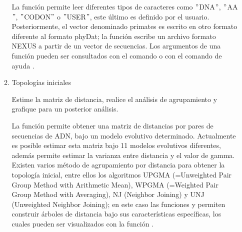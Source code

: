 \begin{itemize}
\begin{enumerate}
La funci\'on  permite leer diferentes tipos de caracteres como $"$DNA$"$,  $"$AA$"$,  $"$CODON$"$ o $"$USER$"$,  este \'ultimo es definido por el usuario. Posteriormente, el vector denominado primates es escrito en otro formato diferente al formato phyDat; la funci\'on  escribe un archivo formato NEXUS a partir de un vector de secuencias. Los argumentos de una funci\'on pueden ser consultados con el comando  o con el comando de ayuda .


{}

\item{Topolog\'ias iniciales}

Estime la matriz de distancia,  realice el an\'alisis de agrupamiento y grafique para un posterior an\'alisis.



La funci\'on  permite obtener una matriz de distancias por pares de secuencias de ADN,  bajo un modelo evolutivo determinado. 
Actualmente es posible estimar esta matriz bajo 11 modelos evolutivos diferentes,  adem\'as permite estimar la varianza entre distancia y el valor de gamma. Existen varios m\'etodo de agrupamiento por distancia para obtener la topolog\'ia inicial,  entre ellos los algoritmos UPGMA (=Unweighted Pair Group Method with Arithmetic Mean),  WPGMA (=Weighted Pair Group Method with Averaging),  NJ (Neighbor Joining) y UNJ (Unweighted Neighbor Joining); en este caso las funciones  y  permiten construir \'arboles de distancia bajo sus caracter\'isticas espec\'ificas,  los cuales pueden ser visualizados con la funci\'on .


\end{enumerate}
\end{itemize}
